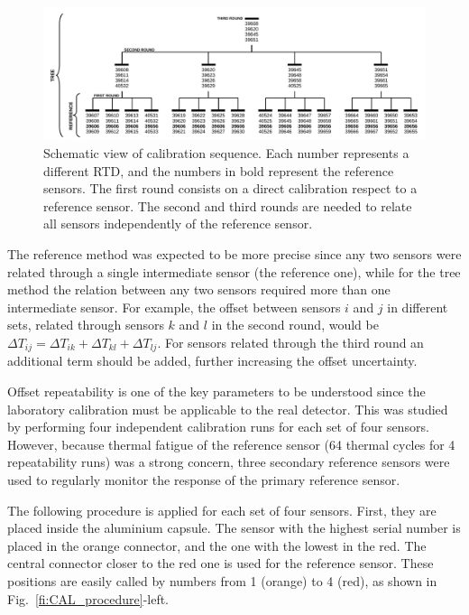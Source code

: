 \begin{figure}[htbp]
\centering
\includegraphics[width=\textwidth]{images/figure_7.pdf}
\caption{Schematic view of calibration sequence. Each number represents a different RTD, and the numbers in bold represent the reference sensors. The first round consists on a direct calibration respect to a reference sensor. The second and third rounds are needed to relate all sensors independently of the reference sensor.
\label{fi:CAL_sequence}}
\end{figure}

The reference method was expected to be more precise since any two sensors were related through a single intermediate sensor (the reference one), while for the tree method the relation between any two sensors required more than one intermediate sensor. For example, the offset between sensors $i$ and $j$ in different sets, related through sensors $k$ and $l$ in the second round, would be $\Delta T_{ij} = \Delta T_{ik} + \Delta T_{kl} + \Delta T_{lj}$. For sensors related through the third round an additional term should be added, further increasing the offset uncertainty. 

Offset repeatability is one of the key parameters to be understood since the laboratory calibration must be applicable to the real detector. This was studied by performing four independent calibration runs for each set of four sensors. However, because thermal fatigue of the reference sensor (64 thermal cycles for 4 repeatability runs) was a strong concern, three secondary reference sensors were used to regularly monitor the response of the primary reference sensor. 

The following procedure is applied for each set of four sensors. First, they are placed inside the aluminium capsule. The sensor with the highest serial number is placed in the orange connector, and the one with the lowest in the red. The central connector closer to the red one is used for the reference sensor. These positions are easily called by numbers from 1 (orange) to 4 (red), as shown in Fig.~\ref{fi:CAL_procedure}-left.

